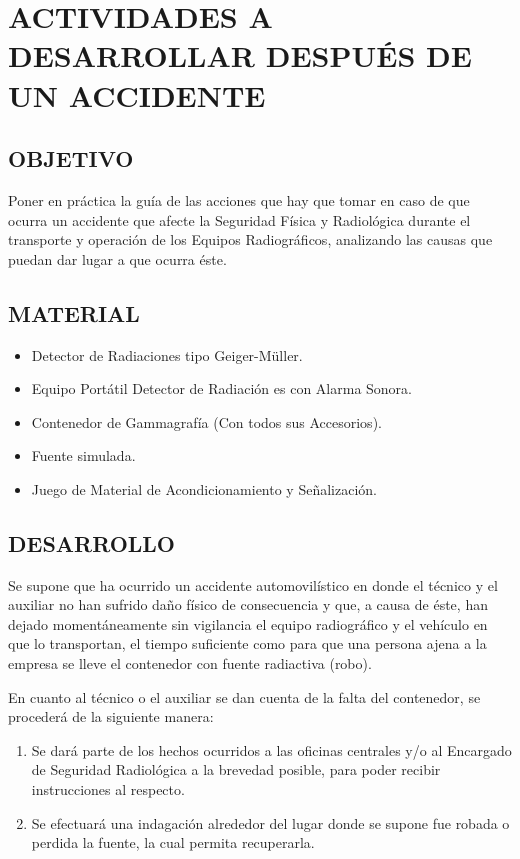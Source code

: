 \section*{ACTIVIDADES A DESARROLLAR DESPUÉS DE UN ACCIDENTE}

\subsection*{OBJETIVO}
Poner en práctica la guía de las acciones que hay que tomar en caso de que ocurra un accidente que afecte la Seguridad Física y Radiológica durante el transporte y operación de los Equipos Radiográficos, analizando las causas que puedan dar lugar a que ocurra éste.

\subsection*{MATERIAL}
\begin{itemize}
  \item Detector de Radiaciones tipo Geiger-Müller.
  \item Equipo Portátil Detector de Radiación es con Alarma Sonora.
  \item Contenedor de Gammagrafía (Con todos sus Accesorios).
  \item Fuente simulada.
  \item Juego de Material de Acondicionamiento y Señalización.
\end{itemize}

\subsection*{DESARROLLO}
Se supone que ha ocurrido un accidente automovilístico en donde el técnico y el auxiliar no han sufrido daño físico de consecuencia y que, a causa de éste, han dejado momentáneamente sin vigilancia el equipo radiográfico y el vehículo en que lo transportan, el tiempo suficiente como para que una persona ajena a la empresa se lleve el contenedor con fuente radiactiva (robo).

En cuanto al técnico o el auxiliar se dan cuenta de la falta del contenedor, se procederá de la siguiente manera:
\begin{enumerate}
  \item Se dará parte de los hechos ocurridos a las oficinas centrales y/o al Encargado de Seguridad Radiológica a la brevedad posible, para poder recibir instrucciones al respecto.
  \item Se efectuará una indagación alrededor del lugar donde se supone fue robada o perdida la fuente, la cual permita recuperarla.
\end{enumerate}